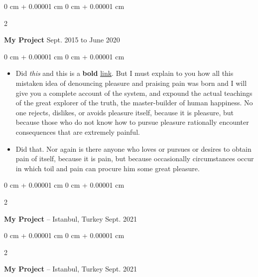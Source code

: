 \documentclass[10pt, letterpaper]{article}
\newenvironment{highlights}{
    \begin{itemize}[
        topsep=0.10 cm,
        parsep=0.10 cm,
        partopsep=0pt,
        itemsep=0pt,
        leftmargin=0 cm + 10pt
    ]
}{
    \end{itemize}
} %
\newenvironment{onecolentry}{
    \begin{adjustwidth}{
        0 cm + 0.00001 cm
    }{
        0 cm + 0.00001 cm
    }
}{
    \end{adjustwidth}
} %
\newenvironment{twocolentry}[2][]{
    \onecolentry
    \def\secondColumn{#2}
    \setcolumnwidth{\fill, 4.5 cm}
    \begin{paracol}{2}
}{
    \switchcolumn \raggedleft \secondColumn
    \end{paracol}
    \endonecolentry
} %
\begin{document}
        \vspace{0.2 cm}

        \begin{twocolentry}{
            Sept. 2015 to June 2020
        }
            \textbf{My Project}\end{twocolentry}

        \vspace{0.10 cm}
        \begin{onecolentry}
            \begin{highlights}
                \item Did \textit{this} and this is a \textbf{bold} \href{https://example.com}{link}. But I must explain to you how all this mistaken idea of denouncing pleasure and praising pain was born and I will give you a complete account of the system, and expound the actual teachings of the great explorer of the truth, the master-builder of human happiness. No one rejects, dislikes, or avoids pleasure itself, because it is pleasure, but because those who do not know how to pursue pleasure rationally encounter consequences that are extremely painful.
                \item Did that. Nor again is there anyone who loves or pursues or desires to obtain pain of itself, because it is pain, but because occasionally circumstances occur in which toil and pain can procure him some great pleasure.
            \end{highlights}
        \end{onecolentry}


        \vspace{0.2 cm}

        \begin{twocolentry}{
            Sept. 2021
        }
            \textbf{My Project} -- Istanbul, Turkey\end{twocolentry}



        \vspace{0.2 cm}

        \begin{twocolentry}{
            Sept. 2021
        }
            \textbf{My Project} -- Istanbul, Turkey\end{twocolentry}
\end{document}

